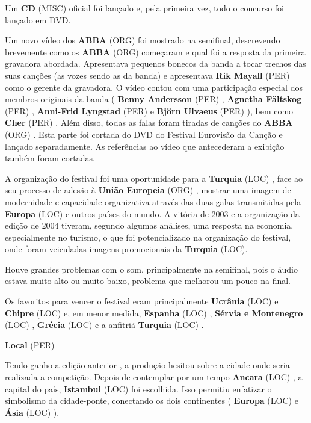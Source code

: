 \documentclass[12pt,a4paper]{article}
\begin{document}
Um \textbf{CD} (MISC) oficial foi lançado e, pela primeira vez, todo o concurso foi lançado em DVD.

Um novo vídeo dos \textbf{ABBA} (ORG) foi mostrado na semifinal, descrevendo brevemente como os \textbf{ABBA} (ORG) começaram e qual foi a resposta da primeira gravadora abordada. Apresentava pequenos bonecos da banda a tocar trechos das suas canções (as vozes sendo as da banda) e apresentava \textbf{Rik Mayall} (PER) como o gerente da gravadora. O vídeo contou com uma participação especial dos membros originais da banda ( \textbf{Benny Andersson} (PER) , \textbf{Agnetha Fältskog} (PER) , \textbf{Anni-Frid Lyngstad} (PER) e \textbf{Björn Ulvaeus} (PER) ), bem como \textbf{Cher} (PER) . Além disso, todas as falas foram tiradas de canções do \textbf{ABBA} (ORG) . Esta parte foi cortada do DVD do Festival Eurovisão da Canção e lançado separadamente. As referências ao vídeo que antecederam a exibição também foram cortadas.

A organização do festival foi uma oportunidade para a \textbf{Turquia} (LOC) , face ao seu processo de adesão à \textbf{União Europeia} (ORG) , mostrar uma imagem de modernidade e capacidade organizativa através das duas galas transmitidas pela \textbf{Europa} (LOC) e outros países do mundo. A vitória de 2003 e a organização da edição de 2004 tiveram, segundo algumas análises, uma resposta na economia, especialmente no turismo, o que foi potencializado na organização do festival, onde foram veiculadas imagens promocionais da \textbf{Turquia} (LOC).

Houve grandes problemas com o som, principalmente na semifinal, pois o áudio estava muito alto ou muito baixo, problema que melhorou um pouco na final.

Os favoritos para vencer o festival eram principalmente \textbf{Ucrânia} (LOC) e \textbf{Chipre} (LOC) e, em menor medida, \textbf{Espanha} (LOC) , \textbf{Sérvia e Montenegro} (LOC) , \textbf{Grécia} (LOC) e a anfitriã \textbf{Turquia} (LOC) .



\textbf{Local} (PER)

Tendo ganho a edição anterior , a produção hesitou sobre a cidade onde seria realizada a competição. Depois de contemplar por um tempo \textbf{Ancara} (LOC) , a capital do país, \textbf{Istambul} (LOC) foi escolhida. Isso permitiu enfatizar o simbolismo da cidade-ponte, conectando os dois continentes ( \textbf{Europa} (LOC) e \textbf{Ásia} (LOC) ).
\end{document}
